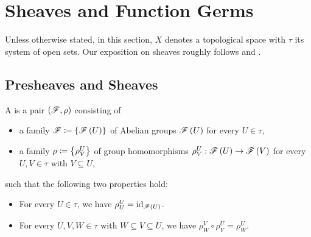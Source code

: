 \documentclass[../Moduli_Spaces_of_Riemann_Surfaces.tex]{subfiles}
\begin{document}
    \section{Sheaves and Function Germs}
    Unless otherwise stated, in this section, $X$ denotes a topological space with $\tau$ its system of open sets. Our exposition on sheaves roughly follows \cite[][Section 6]{forster} and \cite[][Chapter IX]{miranda}.
    \subsection{Presheaves and Sheaves}
    \begin{definition}
        A  is a pair $\left(\mathscr{F},\rho\right)$ consisting of
        \begin{itemize}
            \item a family $\mathscr{F}\coloneqq\left\{\mathscr{F}\left(U\right)\right\}$ of Abelian groups $\mathscr{F}\left(U\right)$ for every $U\in\tau$,
                \vspace{-0.05in}
            \item a family $\rho\coloneqq\left\{\rho^U_V\right\}$ of group homomorphisms $\rho^U_V:\mathscr{F}\left(U\right)\to\mathscr{F}\left(V\right)$ for every $U,V\in\tau$ with $V\subseteq U$,
        \end{itemize}
        such that the following two properties hold:
        \begin{itemize}
            \item For every $U\in\tau$, we have $\rho^U_U=\operatorname{id}_{\mathscr{F}\left(U\right)}$.
                \vspace{-0.05in}
            \item For every $U,V,W\in\tau$ with $W\subseteq V\subseteq U$, we have $\rho^V_W\circ\rho^U_V=\rho^U_W$.
        \end{itemize}
    \end{definition}
\end{document}
